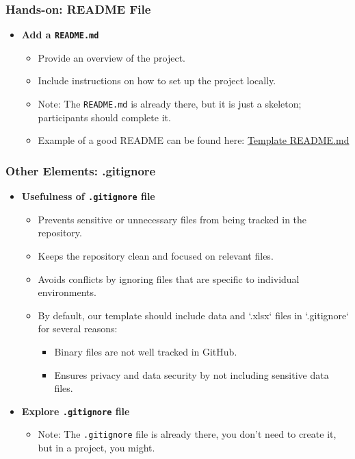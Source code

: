 \documentclass[aspectratio=169]{beamer}
\begin{document}
\begin{frame}
\frametitle{Hands-on: README File}
\begin{itemize}
    \item \textbf{Add a \texttt{README.md}}
    \begin{itemize}
        \item Provide an overview of the project.
        \item Include instructions on how to set up the project locally.
        \item Note: The \texttt{README.md} is already there, but it is just a skeleton; participants should complete it.
        \item Example of a good README can be found here: 
        \href{https://github.com/social-science-data-editors/template_README/blob/release-candidate/templates/README.md}{Template README.md}
    \end{itemize}
\end{itemize}
\end{frame}

\begin{frame}
\frametitle{Other Elements: .gitignore}
\begin{itemize}
     \item \textbf{Usefulness of \texttt{.gitignore} file}
        \begin{itemize}
            \item Prevents sensitive or unnecessary files from being tracked in the repository.
            \item Keeps the repository clean and focused on relevant files.
            \item Avoids conflicts by ignoring files that are specific to individual environments.
            \item By default, our template should include data and `.xlsx` files in `.gitignore` for several reasons:
            \begin{itemize}
                \item Binary files are not well tracked in GitHub.
                \item Ensures privacy and data security by not including sensitive data files.
            \end{itemize}
        \end{itemize}
    \item \textbf{Explore \texttt{.gitignore} file}
    \begin{itemize}
        \item Note: The \texttt{.gitignore} file is already there, you don't need to create it, but in a project, you might.
        \end{itemize}
   
\end{itemize}
\end{frame}
\end{document}
